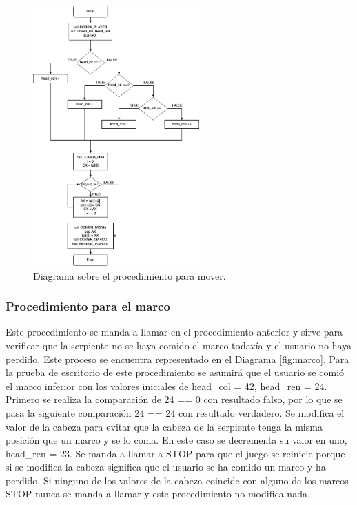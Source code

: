 \documentclass[12pt]{article}
\begin{document}
\begin{figure}
    \centering
    \includegraphics[height= 10cm]{img/diagramas/02DiagramaMover.png}
    \caption{Diagrama sobre el procedimiento para mover.}
    \label{fig:mover}
\end{figure}

\subsubsection*{Procedimiento para el marco}
Este procedimiento se manda a llamar en el procedimiento anterior y sirve para verificar que la serpiente no se haya comido el marco todavía y el usuario no haya perdido. Este proceso se encuentra representado en el Diagrama \ref{fig:marco}. Para la prueba de escritorio de este procedimiento se asumirá que el usuario se comió el marco inferior con los valores iniciales de head\_col = 42, head\_ren = 24. Primero se realiza la comparación de 24 == 0 con resultado falso, por lo que se pasa la siguiente comparación 24 == 24 con resultado verdadero. Se modifica el valor de la cabeza para evitar que la cabeza de la serpiente tenga la misma posición que un marco y se lo coma. En este caso se decrementa su valor en uno, head\_ren = 23. Se manda a llamar a STOP para que el juego se reinicie porque si se modifica la cabeza significa que el usuario se ha comido un marco y ha perdido. Si ninguno de los valores de la cabeza coincide con alguno de los marcos STOP nunca se manda a llamar y este procedimiento no modifica nada.
\end{document}
